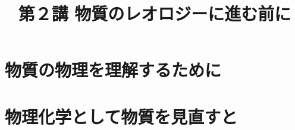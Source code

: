 \documentclass[uplatex,dvipdfmx,a4paper,11pt]{jsreport}
\title{第２講 物質のレオロジーに進む前に}
\author{}
\date{}
\begin{document}
\maketitle

\setcounter{tocdepth}{2}
\tableofcontents



\chapter{物質の物理を理解するために}


\chapter{物理化学として物質を見直すと}




\printindex
\end{document}
